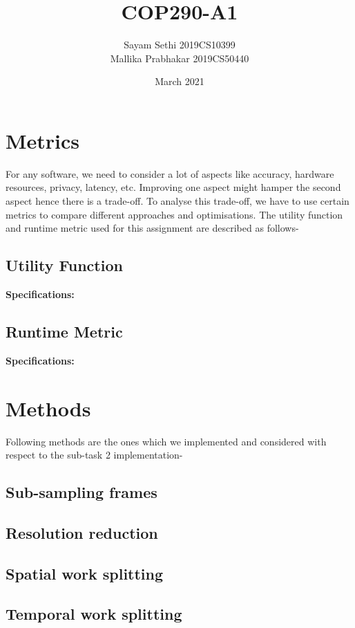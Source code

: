 \documentclass{article}
\title{COP290-A1}
\author{Sayam Sethi 2019CS10399 \\ Mallika Prabhakar 2019CS50440 }
\date{March 2021}
\begin{document}
\maketitle

\section{Metrics}
For any software, we need to consider a lot of aspects like accuracy, hardware resources, privacy, latency, etc. Improving one aspect might hamper the second aspect hence there is a trade-off. To analyse this trade-off, we have to use certain metrics to compare different approaches and optimisations. The utility function and runtime metric used for this assignment are described as follows-

\subsection{Utility Function}


\textbf{Specifications:}


\subsection{Runtime Metric}


\textbf{Specifications: }


\section{Methods}
Following methods are the ones which we implemented and considered with respect to the sub-task 2 implementation-

\subsection{Sub-sampling frames}
\subsection{Resolution reduction}
\subsection{Spatial work splitting}
\subsection{Temporal work splitting}
\end{document}
